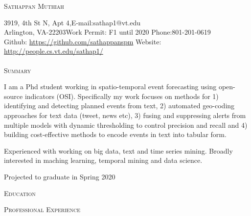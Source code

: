\documentclass[a4paper]{article}
\newcommand{\lineunder} {\vspace*{-8pt} \\
    \hspace*{-18pt} \hrulefill \\
}
\newcommand{\header} [1] {{\hspace*{-18pt}\vspace*{6pt}\large {\textsc{#1}}}
    \vspace*{-6pt} %
}
\begin{document}

\vspace*{-35pt}

\begin{center}
	{\huge \scshape {Sathappan Muthiah}}\\
\end{center}
\small
3919, 4th St N, Apt 4,\hfill E-mail:sathap1@vt.edu\\
Arlington, VA-22203\hfill Work Permit: F1 until 2020 \hfill
Phone:801-201-0619 \\
Github: \url{https://github.com/sathappanspm} \hfill Website:
\url{http://people.cs.vt.edu/sathap1/}  \normalsize \lineunder

%
\header{Summary}

I am a Phd student working in spatio-temporal event forecasting using
open-source indicators (OSI). Specifically my work focuses on methods
for 1) identifying and
detecting planned events from text, 2) automated geo-coding approaches
for text data (tweet, news etc), 3) fusing and suppressing alerts from
multiple models with dynamic thresholding to control precision and
recall and 4) building cost-effective methods to encode events in text
into tabular form.  %

Experienced with working on big data, text and time series mining.
Broadly interested in maching learning, temporal mining and data
science.

Projected to graduate in Spring 2020

\vspace{1em}
\header{Education}


%

\vspace{1em}
\header{Professional Experience}

\end{document}
